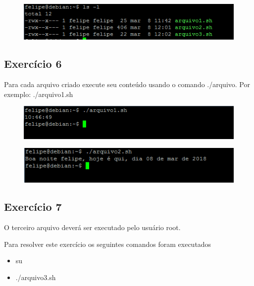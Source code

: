 \documentclass[
	12pt,				%
	openany,			%
	a4paper,			%
	chapter=TITLE,		%
	section=TITLE,		%
	english,
	brazil				%
]{abntex2}
\begin{document}
\begin{figure}[htp]
  \centering
  \includegraphics[scale=1]{exe5.png}
\end{figure}


\subsection{Exercício 6}

Para cada  arquivo  criado  execute  seu  conteúdo  usando  o  comando  ./arquivo.  Por exemplo: ./arquivo1.sh

\begin{figure}[htp]
  \centering
  \includegraphics[scale=1]{exe6-1.png}
\end{figure}

\begin{figure}[htp]
  \centering
  \includegraphics[scale=1]{exe6-2.png}
\end{figure}

\subsection{Exercício 7}

O terceiro arquivo deverá ser executado pelo usuário root.

Para resolver este exercício os seguintes comandos foram executados

\begin{itemize}
	\item su
	\item ./arquivo3.sh
\end{itemize}
\end{document}
